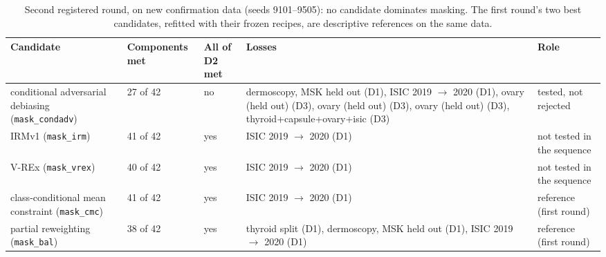 \begin{table}[H]\centering\scriptsize
\caption{Second registered round, on new confirmation data (seeds 9101--9505): no candidate dominates masking. The first round's two best candidates, refitted with their frozen recipes, are descriptive references on the same data.}\label{tab:s17rNine}
\begin{tabular}{p{4.6cm}p{1.6cm}p{1.3cm}p{5.2cm}p{2.4cm}}\toprule
Candidate & Components met & All of D2 met & Losses & Role \\\midrule
conditional adversarial debiasing (\texttt{mask\_condadv}) & 27 of 42 & no & dermoscopy, MSK held out (D1), ISIC 2019 $\to$ 2020 (D1), ovary (held out) (D3), ovary (held out) (D3), ovary (held out) (D3), thyroid+capsule+ovary+isic (D3) & tested, not rejected \\
IRMv1 (\texttt{mask\_irm}) & 41 of 42 & yes & ISIC 2019 $\to$ 2020 (D1) & not tested in the sequence \\
V-REx (\texttt{mask\_vrex}) & 40 of 42 & yes & ISIC 2019 $\to$ 2020 (D1) & not tested in the sequence \\
class-conditional mean constraint (\texttt{mask\_cmc}) & 41 of 42 & yes & ISIC 2019 $\to$ 2020 (D1) & reference (first round) \\
partial reweighting (\texttt{mask\_bal}) & 38 of 42 & yes & thyroid split (D1), dermoscopy, MSK held out (D1), ISIC 2019 $\to$ 2020 (D1) & reference (first round) \\
\bottomrule\end{tabular}
\end{table}
